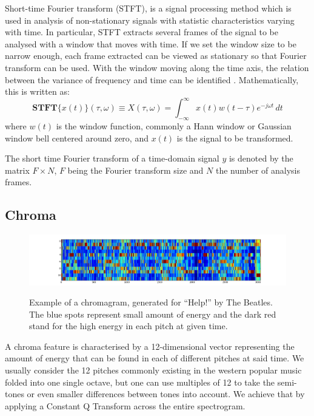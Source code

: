 Short-time Fourier transform (STFT), is a signal processing method which is used in analysis of non-stationary signals with statistic characteristics varying with time.
In particular, STFT extracts several frames of the signal to be analysed with a window that moves with time. If we set the window size to be narrow enough, each frame extracted can be viewed as stationary so that Fourier transform can be used. With the window moving along the time axis, the relation between the variance of frequency and time can be identified \cite{STFT}.
Mathematically, this is written as:
\begin{equation}
\mathbf{STFT}\{x(t)\}(\tau,\omega) \equiv X(\tau, \omega) = \int_{-\infty}^{\infty} x(t) w(t-\tau) e^{-j \omega t} \, dt 
\end{equation}
where $w(t)$ is the window function, commonly a Hann window or Gaussian window bell centered around zero, and $x(t)$ is the signal to be transformed. 

The short time Fourier transform of a time-domain signal $y$ is denoted by the matrix $F \times N$, $F$ being the Fourier transform size and $N$ the number of analysis frames.

\vspace{10pt}

\subsection{Chroma}

\begin{figure}       
      \centering
                \includegraphics[width=\textwidth]{Figures/chromagram_example}
			   \vspace{20pt}
			   \label{fig:chromaexample}
			   \caption{Example of a chromagram, generated for ``Help!'' by The Beatles. The blue spots represent small amount of energy and the dark red stand for the high energy in each pitch at given time.}
\end{figure}

A chroma feature is characterised by a 12-dimensional vector representing the amount of energy that can be found in each of different pitches at said time. We usually consider the 12 pitches commonly existing in the western popular music folded into one single octave, but one can use multiples of 12 to take the semi-tones or even smaller differences between tones into account. We achieve that by applying a Constant Q Transform across the entire spectrogram. 

